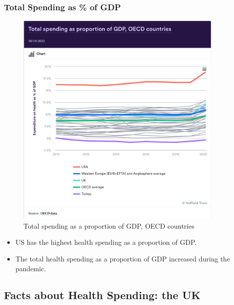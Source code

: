         \subsubsection{Total Spending as \% of GDP}
            \begin{figure}[H]
                \centering
                \includegraphics[width=4in]{images/ch3/3 GDP.png}
                \caption{Total spending as a proportion of GDP, OECD countries}
            \end{figure}            
            \begin{itemize}
                \item US has the highest health spending as a proportion of GDP.
                \item The total health spending as a proportion of GDP increased during the pandemic.
            \end{itemize}
        
    \subsection{Facts about Health Spending: the UK}
    
